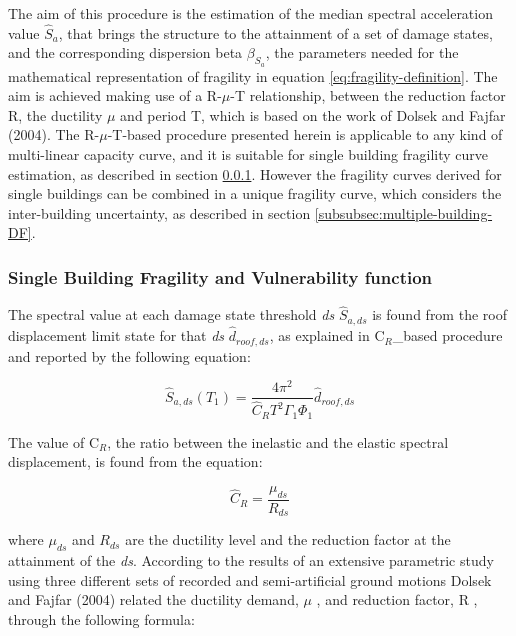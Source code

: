 The aim of this procedure is the estimation of the median spectral acceleration value $\hat{S}_a$, that brings the structure to the attainment of a set of damage states, and the corresponding dispersion beta $\beta_{S_a}$, the parameters needed for the mathematical representation of fragility in equation \ref{eq:fragility-definition}. The aim is achieved making use of a R-$\mu$-T relationship, between the reduction factor R, the ductility $\mu$ and period T, which is based on the work of Dolsek and Fajfar (2004). The R-$\mu$-T-based procedure presented herein is applicable to any kind of multi-linear capacity curve, and it is suitable for single building fragility curve estimation, as described in section \ref{subsubsec:single-building-DF}. However the fragility curves derived for single buildings can be combined in a unique fragility curve, which considers the inter-building uncertainty, as described in section \ref{subsubsec:multiple-building-DF}.

\subsubsection{Single Building Fragility and Vulnerability function}
\label{subsubsec:single-building-DF}
The spectral value at each damage state threshold \textit{ds} $\hat{S}_{a,ds}$ is found from the roof displacement limit state for that \textit{ds} $\hat{d}_{roof, ds}$, as explained in C$_{R}$\_based procedure and reported by the following equation:

\begin{equation}
\hat{S}_{a,ds}(T_1) = \frac{4 \pi^2}{\hat{C}_R T^2 \Gamma_1 \Phi_1} \hat{d}_{roof, ds}
\label{eq:basic_DF}
\end{equation}

The value of C$_R$, the ratio between the inelastic and the elastic spectral displacement, is found from the equation:

\begin{equation}
\hat{C}_{R} = \frac{\mu_{ds}}{R_{ds}}
\label{eq:Cr_DF}
\end{equation}

where $\mu_{ds}$ and $R_{ds}$ are the ductility level and the reduction factor at the attainment of the \textit{ds}. According to the results of an extensive parametric study using three different sets of recorded and semi-artificial ground motions Dolsek and Fajfar (2004) related the ductility demand, $\mu$ , and reduction factor, R , through the following formula:


